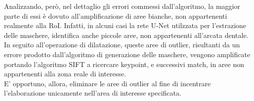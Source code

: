 \documentclass[12pt,a4paper,openright,twoside]{book}
\begin{document}
Analizzando, però, nel dettaglio gli errori commessi dall'algoritmo, la maggior parte di essi è dovuto all'amplificazione di aree bianche, non appartenenti realmente alla RoI. Infatti, in alcuni casi la rete U-Net utilzzata per l'estrazione delle maschere, identifica anche piccole aree, non appartenenti all'arcata dentale.\\
In seguito all'operazione di dilatazione, queste aree di outlier, risultanti da un errore prodotto dall'algoritmo di generazione delle maschere, vengono amplificate portando l'algoritmo SIFT a ricercare keypoint, e successivi match, in aree non appartenenti alla zona reale di interesse.\\
E' opportuno, allora, eliminare le aree di outlier al fine di incentrare l'elaborazione unicamente nell'area di interesse specificata.


\end{document}

